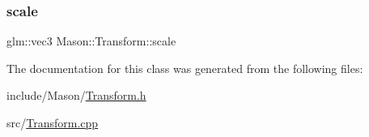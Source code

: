 \hypertarget{class_mason_1_1_transform_a4618b31e34a6ec8a0ee638401fc56367}{}\label{class_mason_1_1_transform_a4618b31e34a6ec8a0ee638401fc56367} 
\subsubsection{\texorpdfstring{scale}{scale}}
{\footnotesize\ttfamily glm\+::vec3 Mason\+::\+Transform\+::scale\hspace{0.3cm}{\ttfamily [protected]}}



The documentation for this class was generated from the following files\+:\begin{DoxyCompactItemize}
\item 
include/\+Mason/\hyperlink{_transform_8h}{Transform.\+h}\item 
src/\hyperlink{_transform_8cpp}{Transform.\+cpp}\end{DoxyCompactItemize}
